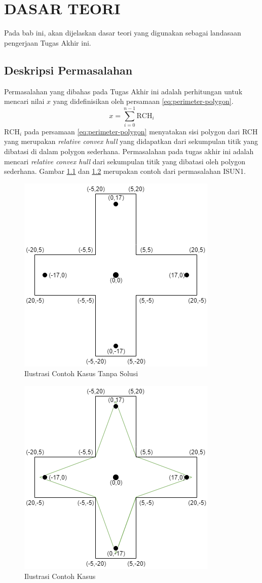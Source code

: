 \chapter {DASAR TEORI}

Pada bab ini, akan dijelaskan dasar teori yang digunakan sebagai landasaan pengerjaan Tugas Akhir ini.

\section{Deskripsi Permasalahan}
Permasalahan yang dibahas pada Tugas Akhir ini adalah perhitungan untuk mencari nilai $x$ yang didefinisikan oleh persamaan \eqref{eq:perimeter-polygon}.
\begin{equation}
    \label{eq:perimeter-polygon}
    x=\sum_{i=0}^{n-1} \text{RCH}_i
\end{equation}
$\text{RCH}_i$ pada persamaan \eqref{eq:perimeter-polygon} menyatakan sisi polygon dari RCH yang merupakan \textit{relative convex hull} yang didapatkan dari sekumpulan titik yang dibatasi di dalam polygon sederhana\cite{isun1}. Permasalahan pada tugas akhir ini adalah mencari \textit{relative convex hull} dari sekumpulan titik yang dibatasi oleh polygon sederhana. Gambar \ref{fig:ilustrasi-contoh-kasus-tanpa-solusi} dan \ref{fig:ilustrasi-contoh-kasus} merupakan contoh dari permasalahan ISUN1.
\begin{figure}[!h]
	\Centering
	\includegraphics [width=0.5\columnwidth]{bab2/img/contoh-kasus-tanpa-solusi}
	\caption {Ilustrasi Contoh Kasus Tanpa Solusi}
	\label {fig:ilustrasi-contoh-kasus-tanpa-solusi}
\end{figure}
\begin{figure}[!h]
	\Centering
	\includegraphics [width=0.5\columnwidth]{bab2/img/contoh-kasus}
	\caption {Ilustrasi Contoh Kasus}
	\label {fig:ilustrasi-contoh-kasus}
\end{figure}

